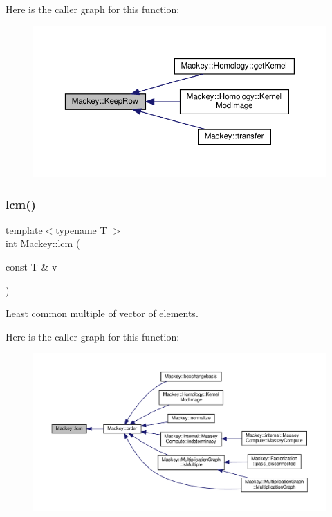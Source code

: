 Here is the caller graph for this function\+:\nopagebreak
\begin{figure}[H]
\begin{center}
\leavevmode
\includegraphics[width=350pt]{namespaceMackey_ad6870101d4fd762100a3115abc4a15db_icgraph}
\end{center}
\end{figure}
\mbox{\label{namespaceMackey_a5d8ae76ffb9440e27bfca124d26ee1b2}} 
\subsubsection{\texorpdfstring{lcm()}{lcm()}}
{\footnotesize\ttfamily template$<$typename T $>$ \\
int Mackey\+::lcm (\begin{DoxyParamCaption}\item[{const T \&}]{v }\end{DoxyParamCaption})}



Least common multiple of vector of elements. 

Here is the caller graph for this function\+:\nopagebreak
\begin{figure}[H]
\begin{center}
\leavevmode
\includegraphics[width=350pt]{namespaceMackey_a5d8ae76ffb9440e27bfca124d26ee1b2_icgraph}
\end{center}
\end{figure}
\mbox{\label{namespaceMackey_ac34d89121229145967593a1b6c30d7aa}} 
